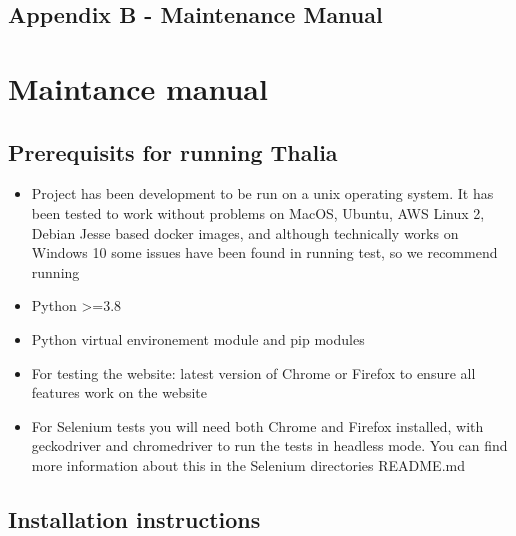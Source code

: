 \documentclass[main.tex]{subfiles}
\begin{document}
\subsection{Appendix B - Maintenance Manual}
\label{MaintenanceManual}
\section{Maintance manual}\label{maintance-manual}

\subsection{Prerequisits for running
Thalia}\label{prerequisits-for-running-thalia}

\begin{itemize}

\item
  Project has been development to be run on a unix operating system. It
  has been tested to work without problems on MacOS, Ubuntu, AWS Linux
  2, Debian Jesse based docker images, and although technically works on
  Windows 10 some issues have been found in running test, so we
  recommend running
\item
  Python \textgreater=3.8
\item
  Python virtual environement module and pip modules
\item
  For testing the website: latest version of Chrome or Firefox to ensure
  all features work on the website
\item
  For Selenium tests you will need both Chrome and Firefox installed,
  with geckodriver and chromedriver to run the tests in headless mode.
  You can find more information about this in the Selenium directories
  README.md
\end{itemize}

\subsection{Installation instructions}\label{installation-instructions}
\end{document}
